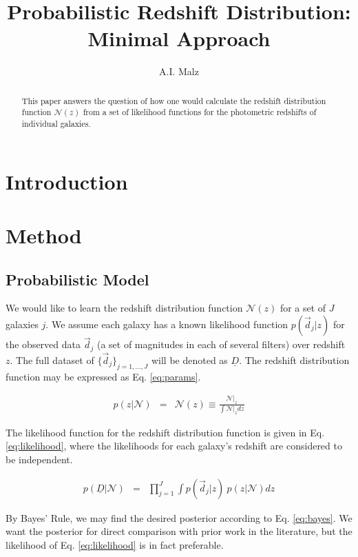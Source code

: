 \documentclass[12pt, onecolumn]{emulateapj}
\newcommand{\textul}{\underline}
\begin{document}
\title{Probabilistic Redshift Distribution: Minimal Approach}

\author{A.I. Malz}

\begin{abstract}
This paper answers the question of how one would calculate the redshift distribution function $\mathcal{N}(z)$ from a set of likelihood functions for the photometric redshifts of individual galaxies.
\end{abstract}


\section{Introduction}

\section{Method}

\subsection{Probabilistic Model}

We would like to learn the redshift distribution function $\mathcal{N}(z)$ for a set of $J$ galaxies $j$.  We assume each galaxy has a known likelihood function $p(\vec{d}_{j}|z)$ for the observed data $\vec{d}_{j}$ (a set of magnitudes in each of several filters) over redshift $z$.  The full dataset of $\{\vec{d}_{j}\}_{j=1,\dots,J}$ will be denoted as $\textul{D}$.  The redshift distribution function may be expressed as Eq. \ref{eq:params}.

\begin{eqnarray}
\label{eq:params}
p(z|\mathcal{N}) &=& \mathcal{N}(z) \equiv \frac{\mathcal{N}|_{z}}{\int\mathcal{N}|_{z}dz}
\end{eqnarray}

The likelihood function for the redshift distribution function is given in Eq. \ref{eq:likelihood}, where the likelihoods for each galaxy's redshift are considered to be independent.  

\begin{eqnarray}
\label{eq:likelihood}
p(\textul{D}|\mathcal{N}) &=& \prod_{j=1}^{J}\int p(\vec{d}_{j}|z)\ p(z|\mathcal{N})dz
\end{eqnarray}

By Bayes' Rule, we may find the desired posterior according to Eq. \ref{eq:bayes}.  We want the posterior for direct comparison with prior work in the literature, but the likelihood of Eq. \ref{eq:likelihood} is in fact preferable.
\end{document}
